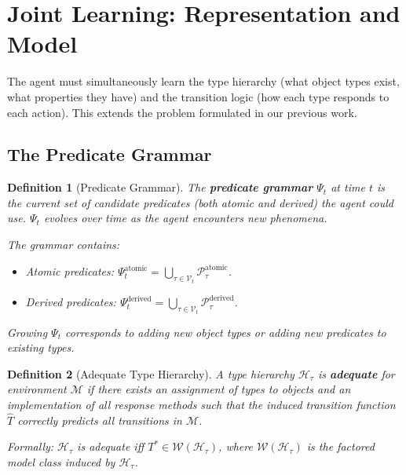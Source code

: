 \documentclass{article}
\newtheorem{definition}{Definition}
\newcommand{\calH}{\mathcal{H}}
\newcommand{\calM}{\mathcal{M}}
\newcommand{\calP}{\mathcal{P}}
\newcommand{\calV}{\mathcal{V}}
\newcommand{\calW}{\mathcal{W}}
\begin{document}

\section{Joint Learning: Representation and Model}
\label{sec:joint}

The agent must simultaneously learn the type hierarchy (what object types
exist, what properties they have) and the transition logic (how each type
responds to each action).  This extends the problem formulated in our
previous work.

\subsection{The Predicate Grammar}
\label{sec:grammar}

\begin{definition}[Predicate Grammar]
\label{def:grammar}
The \textbf{predicate grammar} $\Psi_t$ at time $t$ is the current set of
candidate predicates (both atomic and derived) the agent could use.  $\Psi_t$
evolves over time as the agent encounters new phenomena.

The grammar contains:
\begin{itemize}[nosep]
    \item Atomic predicates: $\Psi_t^{\text{atomic}} =
          \bigcup_{\tau \in \calV_t} \calP_\tau^{\text{atomic}}$.
    \item Derived predicates: $\Psi_t^{\text{derived}} =
          \bigcup_{\tau \in \calV_t} \calP_\tau^{\text{derived}}$.
\end{itemize}
Growing $\Psi_t$ corresponds to adding new object types or adding new
predicates to existing types.
\end{definition}

\begin{definition}[Adequate Type Hierarchy]
\label{def:adequate}
A type hierarchy $\calH_\tau$ is \textbf{adequate} for environment $\calM$
if there exists an assignment of types to objects and an implementation of
all response methods such that the induced transition function $\hat{T}$
correctly predicts all transitions in $\calM$.

Formally: $\calH_\tau$ is adequate iff $T^* \in \calW(\calH_\tau)$, where
$\calW(\calH_\tau)$ is the factored model class induced by $\calH_\tau$.
\end{definition}
\end{document}
